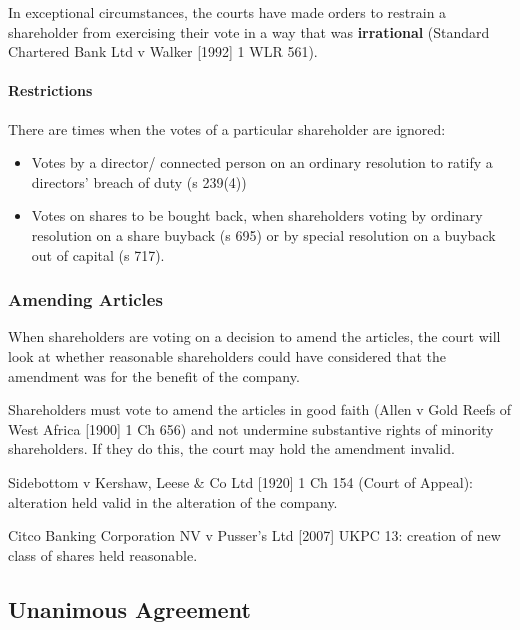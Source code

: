 \documentclass[
]{article}
\providecommand{\tightlist}{%
  \setlength{\itemsep}{0pt}\setlength{\parskip}{0pt}}
\begin{document}
In exceptional circumstances, the courts have made orders to restrain a
shareholder from exercising their vote in a way that was
\textbf{irrational} (Standard Chartered Bank Ltd v Walker {[}1992{]} 1
WLR 561).

\hypertarget{restrictions}{%
\paragraph{Restrictions}\label{restrictions}}

There are times when the votes of a particular shareholder are ignored:

\begin{itemize}
\tightlist
\item
  Votes by a director/ connected person on an ordinary resolution to
  ratify a directors' breach of duty (s 239(4))
\item
  Votes on shares to be bought back, when shareholders voting by
  ordinary resolution on a share buyback (s 695) or by special
  resolution on a buyback out of capital (s 717).
\end{itemize}

\hypertarget{amending-articles}{%
\subsubsection{Amending Articles}\label{amending-articles}}

When shareholders are voting on a decision to amend the articles, the
court will look at whether reasonable shareholders could have considered
that the amendment was for the benefit of the company.

Shareholders must vote to amend the articles in good faith (Allen v Gold
Reefs of West Africa {[}1900{]} 1 Ch 656) and not undermine substantive
rights of minority shareholders. If they do this, the court may hold the
amendment invalid.

Sidebottom v Kershaw, Leese \& Co Ltd {[}1920{]} 1 Ch 154 (Court of
Appeal): alteration held valid in the alteration of the company.

Citco Banking Corporation NV v Pusser's Ltd {[}2007{]} UKPC 13: creation
of new class of shares held reasonable.

\hypertarget{unanimous-agreement}{%
\subsection{Unanimous Agreement}\label{unanimous-agreement}}
\end{document}
